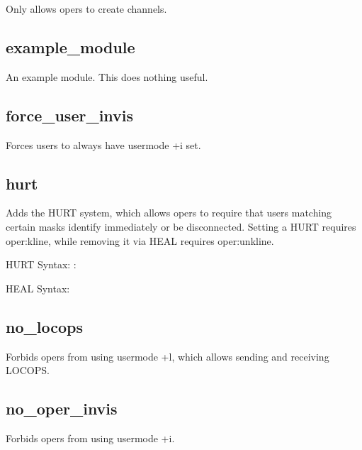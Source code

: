 	Only allows opers to create channels.

\subsection{example\_module}

	An example module.  This does nothing useful.

\subsection{force\_user\_invis}

	Forces users to always have usermode +i set.

\subsection{hurt}

	Adds the HURT system, which allows opers to require that users matching
	certain masks identify immediately or be disconnected.  Setting a HURT
	requires oper:kline, while removing it via HEAL requires oper:unkline.

	HURT Syntax:    :

	HEAL Syntax:  


\subsection{no\_locops}

	Forbids opers from using usermode +l, which allows sending and receiving LOCOPS.

\subsection{no\_oper\_invis}

	Forbids opers from using usermode +i.

